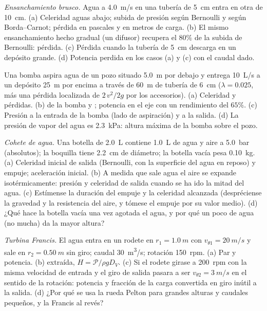 \begin{exercise}[$\star\star$]\label{exo:b2:flow-balances:8}
\emph{Ensanchamiento brusco.} Agua a \qty{4.0}{m/s} en una tubería de \qty{5}{cm} entra
en otra de \qty{10}{cm}. (a) Celeridad aguas abajo; subida de presión según
Bernoulli y según Borda--Carnot; pérdida en pascales y en metros
de carga. (b) El mismo ensanchamiento hecho gradual (un difusor) recupera el $80\%$
de la subida de Bernoulli: pérdida. (c) Pérdida cuando la tubería de \qty{5}{cm} descarga
en un depósito grande. (d) Potencia perdida en los casos (a) y (c) con el caudal dado.
\end{exercise}

\begin{exercise}[$\star\star$]\label{exo:b2:flow-balances:9}
Una bomba aspira agua de un pozo situado \qty{5.0}{m} por debajo y entrega
\qty{10}{L/s} a un depósito \qty{25}{m} por encima a través de \qty{60}{m} de tubería de \qty{6}{cm}
($\lambda = 0.025$, más una pérdida localizada de $2\,v^2/2g$ por los accesorios).
(a) Celeridad y pérdidas. (b)  de la bomba y ; potencia en el eje con un rendimiento del $65\%$. (c) Presión a
la entrada de la bomba (lado de aspiración) y a la salida. (d) La presión
de vapor del agua es \qty{2.3}{kPa}: altura máxima de la bomba sobre el pozo.
\end{exercise}

\begin{exercise}[$\star\star\star$]\label{exo:b2:flow-balances:10}
\emph{Cohete de agua.} Una botella de \qty{2.0}{L} contiene \qty{1.0}{L} de
agua y aire a \qty{5.0}{bar} (absolutos); la boquilla tiene \qty{2.2}{cm} de diámetro;
la botella vacía pesa \qty{0.10}{kg}. (a) Celeridad inicial de salida
(Bernoulli, con la superficie del agua en reposo) y empuje; aceleración
inicial. (b) A medida que sale agua el aire se expande isotérmicamente:
presión y celeridad de salida cuando se ha ido la mitad del agua.
(c) Estímense la duración del empuje y la celeridad alcanzada
(despréciense la gravedad y la resistencia del aire, y tómese el empuje
por su valor medio). (d) ¿Qué hace la botella vacía una vez agotada el
agua, y por qué un poco de agua (no mucha) da la mayor altura?
\end{exercise}

\begin{exercise}[$\star\star\star$]\label{exo:b2:flow-balances:11}
\emph{Turbina Francis.} El agua entra en un rodete en $r_1 = \qty{1.0}{m}$ con
$v_{\theta1} = \qty{20}{m/s}$ y sale en $r_2 = \qty{0.50}{m}$ sin giro;
caudal \qty{30}{m^3/s}; rotación \qty{150}{rpm}. (a) Par y potencia.
(b)  extraída, $H = \mathcal P/\rho gD_V$. (c) Si el rodete girase a
\qty{200}{rpm} con la misma velocidad de entrada y el giro de salida pasara a ser
$v_{\theta2} = \qty{3}{m/s}$ en el sentido de la rotación: potencia y
fracción de la carga convertida en giro inútil a la salida. (d) ¿Por qué se usa la
rueda Pelton para grandes alturas y caudales pequeños, y la Francis al revés?
\end{exercise}

